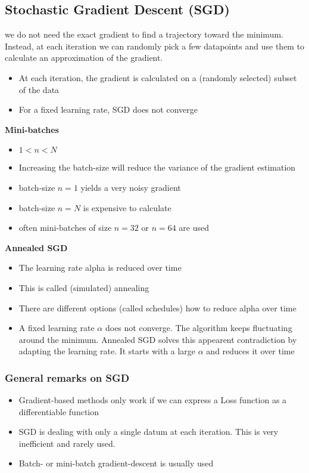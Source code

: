 \subsection{Stochastic Gradient Descent (SGD)}
we do not need the exact gradient to find a trajectory toward the minimum. Instead, at each iteration we can randomly pick a few datapoints and use them to calculate an approximation of the gradient.
\begin{itemize}
    \item At each iteration, the gradient is calculated on a (randomly selected) subset of the data
    \item For a fixed learning rate, SGD does not converge
\end{itemize}

\textbf{Mini-batches} \\

\begin{itemize}
    \item $1<n<N$
    \item Increasing the batch-size will reduce the variance of the gradient estimation
    \item batch-size $n=1$ yields a very noisy gradient
    \item batch-size $n=N$ is expensive to calculate
    \item often mini-batches of size $n=32$ or $n=64$ are used
\end{itemize}

\textbf{Annealed SGD}
\begin{itemize}
    \item The learning rate alpha is reduced over time
    \item This is called (simulated) annealing
    \item There are different options (called schedules) how to reduce alpha over time
    \item A fixed learning rate $\alpha$ does not converge. The algorithm keeps fluctuating around the minimum. Annealed SGD solves this appearent contradiction by adapting the learning rate. It starts with a large $\alpha$ and reduces it over time
\end{itemize}

\subsubsection{General remarks on SGD}
\begin{itemize}
    \item Gradient-based methods only work if we can express a Loss function as a differentiable function
    \item SGD is dealing with only a single datum at each iteration. This is very inefficient and rarely used.
    \item Batch- or mini-batch gradient-descent is usually used
\end{itemize}

